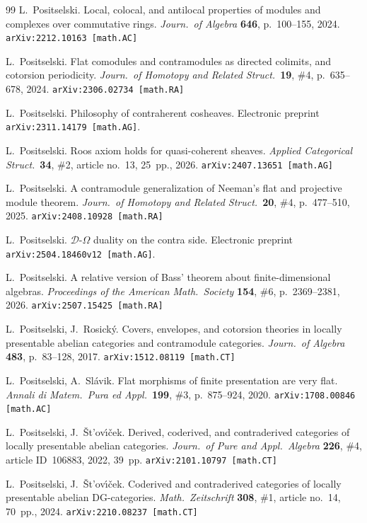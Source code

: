 \documentclass[12pt,a4paper]{amsart}
\newcommand{\+}{\nobreakdash-}
\renewcommand{\:}{\colon}
\theoremstyle{plain}
\theoremstyle{definition}
\begin{document}
\begin{thebibliography}{99}
 L.~Positselski.
   Local, colocal, and antilocal properties of modules and complexes
over commutative rings.
\textit{Journ.\ of Algebra} \textbf{646}, p.~100--155, 2024.
\texttt{arXiv:2212.10163 [math.AC]}

 L.~Positselski.
   Flat comodules and contramodules as directed colimits, and cotorsion
periodicity.
\textit{Journ.\ of Homotopy and Related Struct.}\ \textbf{19}, \#4,
p.~635--678, 2024.  \texttt{arXiv:2306.02734 [math.RA]}

 L.~Positselski.
   Philosophy of contraherent cosheaves.
Electronic preprint \texttt{arXiv:2311.14179 [math.AG]}.

 L.~Positselski.
   Roos axiom holds for quasi-coherent sheaves.
\textit{Applied Categorical Struct.}\ \textbf{34}, \#2, article no.~13,
25~pp., 2026.  \texttt{arXiv:2407.13651 [math.AG]}

 L.~Positselski.
   A contramodule generalization of Neeman's flat and projective module
theorem.
\textit{Journ.\ of Homotopy and Related Struct.}\ \textbf{20}, \#4,
p.~477--510, 2025.  \texttt{arXiv:2408.10928 [math.RA]}

 L.~Positselski.
   $\mathcal D$\+$\Omega$ duality on the contra side.
Electronic preprint \texttt{arXiv:2504.18460v12 [math.AG]}.

 L.~Positselski.
   A relative version of Bass' theorem about finite-dimensional
algebras.
\textit{Proceedings of the American Math.\ Society} \textbf{154}, \#6,
p.~2369--2381, 2026.  \texttt{arXiv:2507.15425 [math.RA]}

 L.~Positselski, J.~Rosick\'y.
   Covers, envelopes, and cotorsion theories in locally presentable
abelian categories and contramodule categories.
\textit{Journ.\ of Algebra} \textbf{483}, p.~83--128, 2017.
\texttt{arXiv:1512.08119 [math.CT]}

 L.~Positselski, A.~Sl\'avik.
   Flat morphisms of finite presentation are very flat.
\textit{Annali di Matem.\ Pura ed Appl.}\ \textbf{199}, \#3,
p.~875--924, 2020.  \texttt{arXiv:1708.00846 [math.AC]} 

 L.~Positselski, J.~\v St\!'ov\'\i\v cek.
   Derived, coderived, and contraderived categories of locally
presentable abelian categories.
\textit{Journ.\ of Pure and Appl.\ Algebra} \textbf{226}, \#4,
article ID~106883, 2022, 39~pp.  \texttt{arXiv:2101.10797 [math.CT]}

 L.~Positselski, J.~\v St\!'ov\'\i\v cek.
   Coderived and contraderived categories of locally presentable
abelian DG\+categories.
\textit{Math.\ Zeitschrift} \textbf{308}, \#1, article no.~14, 70~pp.,
2024.  \texttt{arXiv:2210.08237 [math.CT]}


\end{thebibliography}
\end{document}
